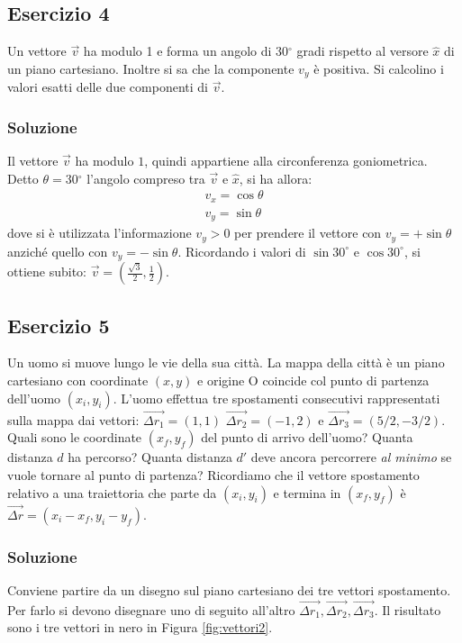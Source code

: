\documentclass[12pt,a4paper]{book}
\begin{document}
\subsection*{Esercizio 4}
Un vettore $\vec{v}$ ha modulo 1 e forma un angolo di 30$^{\circ}$ gradi rispetto al versore $\hat{x}$ di un piano cartesiano. Inoltre si sa che la componente $v_y$ è positiva. Si calcolino i valori esatti delle due componenti di $\vec{v}$. 
\subsubsection*{Soluzione}
Il vettore $\vec{v}$ ha modulo $1$, quindi appartiene alla circonferenza goniometrica. Detto $\theta=$30$^{\circ}$ l'angolo compreso tra 
$\vec{v}$ e $\hat{x}$, si ha allora:
\begin{gather*}
v_x=\cos \theta\\
v_y=\sin \theta
\end{gather*}
dove si è utilizzata l'informazione $v_y>0$ per prendere il vettore con $v_y=+\sin \theta$ anziché quello con $v_y=-\sin \theta$. Ricordando i valori 
di $\sin 30^{\circ}$ e $\cos 30^{\circ}$, si ottiene subito: $\vec{v}=(\frac{\sqrt{3}}{2}, \frac{1}{2})$. 

\subsection*{Esercizio 5}
Un uomo si muove lungo le vie della sua città. La mappa della città è un piano cartesiano con coordinate $(x,y)$ e origine O coincide col punto di partenza dell'uomo $(x_i, y_i)$. L'uomo effettua tre spostamenti consecutivi rappresentati sulla mappa dai vettori: $\vec{\Delta r_1}=(1,1)$ $\vec{\Delta r_2}=(-1,2)$ e $\vec{\Delta r_3}=(5/2,-3/2)$. Quali sono le coordinate $(x_f, y_f)$ del punto di arrivo dell'uomo? Quanta distanza $d$ ha percorso? Quanta distanza $d'$ deve ancora percorrere \textit{al minimo} se vuole tornare al punto di partenza? Ricordiamo che il vettore spostamento relativo a una traiettoria che parte da $(x_i, y_i)$ e termina in $(x_f,y_f)$ è $\vec{\Delta r}=(x_i-x_f, y_i-y_f)$. 
\subsubsection*{Soluzione}
Conviene partire da un disegno sul piano cartesiano dei tre vettori spostamento. Per farlo si devono disegnare uno di seguito all'altro $\vec{\Delta r_1}, \vec{\Delta r_2}, \vec{\Delta r_3}$. Il risultato sono i tre vettori in nero in Figura \ref{fig:vettori2}.
\end{document}
